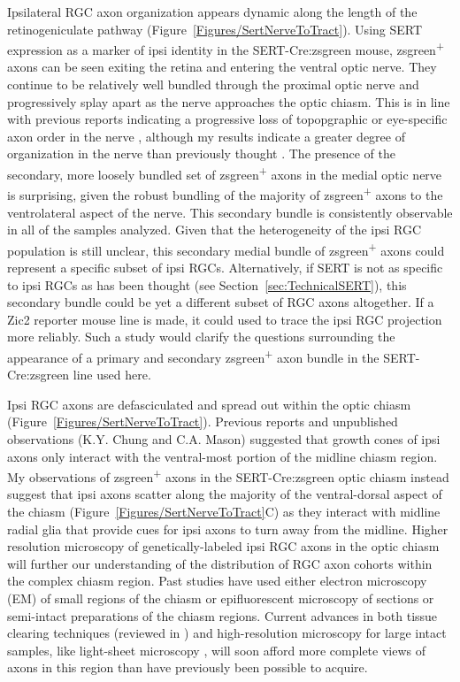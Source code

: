 Ipsilateral RGC axon organization appears dynamic along the length of the retinogeniculate pathway (Figure~\ref{Figures/SertNerveToTract}).
Using SERT expression as a marker of ipsi identity in the SERT-Cre:zsgreen mouse, zsgreen\textsuperscript{+} axons can be seen exiting the retina and entering the ventral optic nerve.
They continue to be relatively well bundled through the proximal optic nerve and progressively splay apart as the nerve approaches the optic chiasm.
This is in line with previous reports indicating a progressive loss of topopgraphic or eye-specific axon order in the nerve \cite{colello1990early,chan1994changes,chan1999changes}, although my results indicate a greater degree of organization in the nerve than previously thought \cite{baker1989distribution,colello1990early}.
The presence of the secondary, more loosely bundled set of zsgreen\textsuperscript{+} axons in the medial optic nerve is surprising, given the robust bundling of the majority of zsgreen\textsuperscript{+} axons to the ventrolateral aspect of the nerve.
This secondary bundle is consistently observable in all of the samples analyzed.
Given that the heterogeneity of the ipsi RGC population is still unclear, this secondary medial bundle of zsgreen\textsuperscript{+} axons could represent a specific subset of ipsi RGCs.
Alternatively, if SERT is not as specific to ipsi RGCs as has been thought (see Section~\ref{sec:TechnicalSERT}), this secondary bundle could be yet a different subset of RGC axons altogether.
If a Zic2 reporter mouse line is made, it could used to trace the ipsi RGC projection more reliably.
Such a study would clarify the questions surrounding the appearance of a primary and secondary zsgreen\textsuperscript{+} axon bundle in the SERT-Cre:zsgreen line used here.

Ipsi RGC axons are defasciculated and spread out within the optic chiasm (Figure~\ref{Figures/SertNerveToTract}).
Previous reports \cite{colello1997changing} and unpublished observations (K.Y. Chung and C.A. Mason) suggested that growth cones of ipsi axons only interact with the ventral-most portion of the midline chiasm region.
My observations of zsgreen\textsuperscript{+} axons in the SERT-Cre:zsgreen optic chiasm instead suggest that ipsi axons scatter along the majority of the ventral-dorsal aspect of the chiasm (Figure~\ref{Figures/SertNerveToTract}C) as they interact with midline radial glia that provide cues for ipsi axons to turn away from the midline.
Higher resolution microscopy of genetically-labeled ipsi RGC axons in the optic chiasm will further our understanding of the distribution of RGC axon cohorts within the complex chiasm region.
Past studies have used either electron microscopy (EM) of small regions of the chiasm or epifluorescent microscopy of sections or semi-intact preparations of the chiasm regions. %
Current advances in both tissue clearing techniques (reviewed in ) and high-resolution microscopy for large intact samples, like light-sheet microscopy \cite{keller2015visualizing}, will soon afford more complete views of axons in this region than have previously been possible to acquire.

